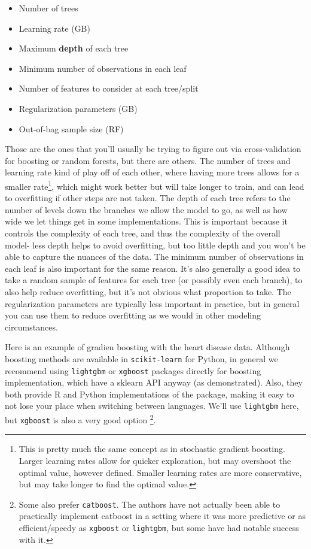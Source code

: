\documentclass[
  letterpaper,
]{krantz}
\providecommand{\tightlist}{%
  \setlength{\itemsep}{0pt}\setlength{\parskip}{0pt}}\usepackage{longtable,booktabs,array}
\begin{document}
\begin{itemize}
\tightlist
\item
  Number of trees
\item
  Learning rate (GB)
\item
  Maximum \textbf{depth} of each tree
\item
  Minimum number of observations in each leaf
\item
  Number of features to consider at each tree/split
\item
  Regularization parameters (GB)
\item
  Out-of-bag sample size (RF)
\end{itemize}

Those are the ones that you'll usually be trying to figure out via
cross-validation for boosting or random forests, but there are others.
The number of trees and learning rate kind of play off of each other,
where having more trees allows for a smaller rate\footnote{This is
  pretty much the same concept as in stochastic gradient boosting.
  Larger learning rates allow for quicker exploration, but may overshoot
  the optimal value, however defined. Smaller learning rates are more
  conservative, but may take longer to find the optimal value.}, which
might work better but will take longer to train, and can lead to
overfitting if other steps are not taken. The depth of each tree refers
to the number of levels down the branches we allow the model to go, as
well as how wide we let things get in some implementations. This is
important because it controls the complexity of each tree, and thus the
complexity of the overall model- less depth helps to avoid overfitting,
but too little depth and you won't be able to capture the nuances of the
data. The minimum number of observations in each leaf is also important
for the same reason. It's also generally a good idea to take a random
sample of features for each tree (or possibly even each branch), to also
help reduce overfitting, but it's not obvious what proportion to take.
The regularization parameters are typically less important in practice,
but in general you can use them to reduce overfitting as we would in
other modeling circumstances.

Here is an example of gradien boosting with the heart disease data.
Although boosting methods are available in \texttt{scikit-learn} for
Python, in general we recommend using \texttt{lightgbm} or
\texttt{xgboost} packages directly for boosting implementation, which
have a sklearn API anyway (as demonstrated). Also, they both provide R
and Python implementations of the package, making it easy to not lose
your place when switching between languages. We'll use \texttt{lightgbm}
here, but \texttt{xgboost} is also a very good option \footnote{Some
  also prefer \texttt{catboost}. The authors have not actually been able
  to practically implement catboost in a setting where it was more
  predictive or as efficient/speedy as \texttt{xgboost} or
  \texttt{lightgbm}, but some have had notable success with it.}.
\end{document}
